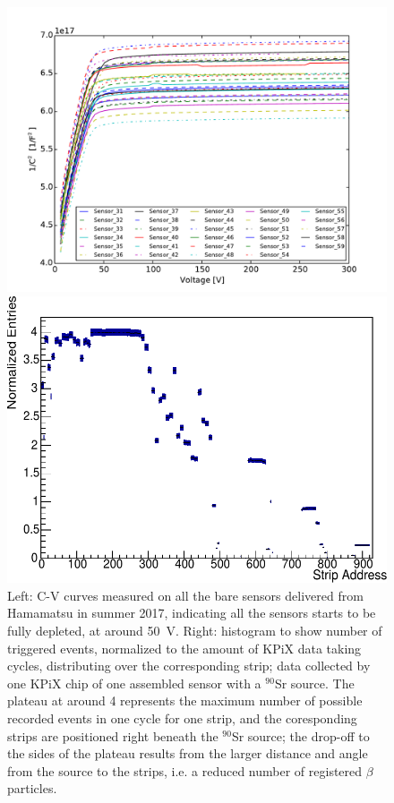 \begin{figure}[!ht]%
\centering
\begin{minipage}{.5\textwidth}
  \centering
  \includegraphics[width=1.08\linewidth]{pics/All_sensors_CV.pdf}
\end{minipage}%
\begin{minipage}{.5\textwidth}
  \includegraphics[width=\linewidth]{pics/S58_K2_2018_05_07_16_49_42_strip_entries_modded}
\end{minipage}%
\caption{
Left: C-V curves measured on all the bare sensors delivered from Hamamatsu in summer 2017, indicating all the sensors starts to be fully depleted, at around \SI{50}{\volt}.
Right: histogram to show number of triggered events, normalized to the amount of KPiX data taking cycles, distributing over the corresponding strip;
data collected by one KPiX chip of one assembled sensor with a $^{90}$Sr source.
The plateau at around 4 represents the maximum number of possible recorded events in one cycle for one strip, and the coresponding strips are positioned right beneath the $^{90}$Sr source;
the drop-off to the sides of the plateau results from the larger distance and angle from the source to the strips, i.e. a reduced number of registered $\beta$ particles.
}%
\label{fig:2figs}%
\end{figure}

